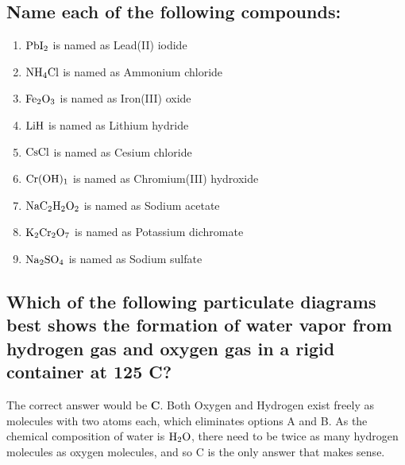 \documentclass[11pt]{article}
\begin{document}
\subsection{Name each of the following compounds:}
\label{sec:org2696b37}
\begin{enumerate}
\item \(\ce{PbI2}\) is named as Lead(II) iodide
\item \(\ce{NH4Cl}\) is named as Ammonium chloride
\item \(\ce{Fe2O3}\) is named as Iron(III) oxide
\item \(\ce{LiH}\) is named as Lithium hydride
\item \(\ce{CsCl}\) is named as Cesium chloride
\item \(\ce{Cr(OH)1}\) is named as Chromium(III) hydroxide
\item \(\ce{NaC2H2O2}\) is named as Sodium acetate
\item \(\ce{K2Cr2O7}\) is named as Potassium dichromate
\item \(\ce{Na2SO4}\) is named as Sodium sulfate
\end{enumerate}

\subsection{Which of the following particulate diagrams best shows the formation of water vapor from hydrogen gas and oxygen gas in a rigid container at 125\textdegree{} C?}
\label{sec:org89868b7}
The correct answer would be \textbf{C}. Both Oxygen and Hydrogen exist freely as molecules with two atoms each, which eliminates options A and B. As the chemical composition of water is \(\ce{H2O}\), there need to be twice as many hydrogen molecules as oxygen molecules, and so C is the only answer that makes sense.
\end{document}
